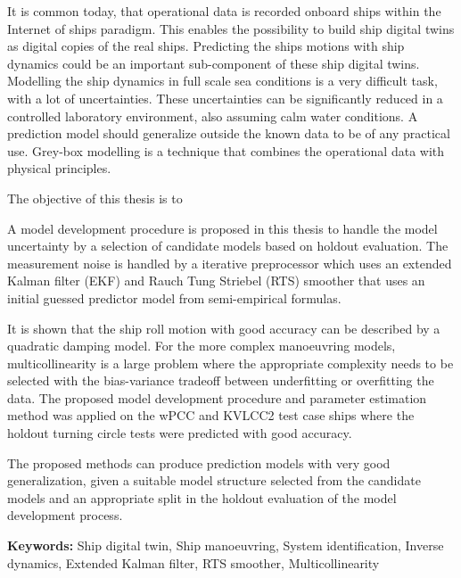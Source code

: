 
It is common today, that operational data is recorded onboard ships within the Internet of ships paradigm. This enables the possibility to build ship digital twins as digital copies of the real ships. Predicting the ships motions with ship dynamics could be an important sub-component of these ship digital twins. Modelling the ship dynamics in full scale sea conditions is a very difficult task, with a lot of uncertainties. These uncertainties can be significantly reduced in a controlled laboratory environment, also assuming calm water conditions. A prediction model should generalize outside the known data to be of any practical use. Grey-box modelling is a technique that combines the operational data with physical principles.  

The objective of this thesis is to 
\noindent \objective 

A model development procedure is proposed in this thesis to handle the model uncertainty by a selection of candidate models based on holdout evaluation. The measurement noise is handled by a iterative preprocessor which uses an extended Kalman filter (EKF) and Rauch Tung Striebel (RTS) smoother that uses an initial guessed predictor model from semi-empirical formulas.

It is shown that the ship roll motion with good accuracy can be described by a quadratic damping model. For the more complex manoeuvring models, multicollinearity is a large problem where the appropriate complexity needs to be selected with the bias-variance tradeoff between underfitting or overfitting the data. 
The proposed model development procedure and parameter estimation method was applied on the wPCC and KVLCC2 test case ships where the holdout turning circle tests were predicted with good accuracy.

The proposed methods can produce prediction models with very good generalization, given a suitable model structure selected from the candidate models and an appropriate split in the holdout evaluation of the model development process. 

\vspace{0.1cm}
\textbf{Keywords:} Ship digital twin, Ship manoeuvring, System identification, Inverse dynamics, Extended Kalman filter, RTS smoother, Multicollinearity
